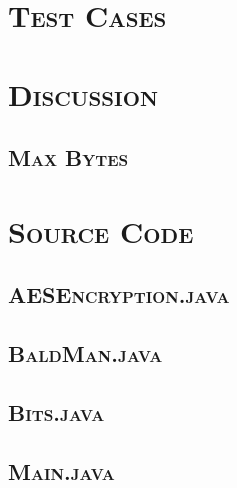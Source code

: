 \documentclass[12pt]{article}
\begin{document}
	\section[Test Cases]{\Large{}\selectfont\scshape Test Cases}
	
	\section[Discussion]{\Large{}\selectfont\scshape Discussion}
	
	\subsection[Max Bytes]{\hspace*{1em}\large{}\selectfont\scshape Max Bytes}
	
	\section[Source Code]{\Large{}\selectfont\scshape Source Code}
	
	\subsection[AESEncryption]{\hspace*{1em}\large{}\selectfont\scshape AESEncryption.java}
	
	
	\subsection[BaldMan]{\hspace*{1em}\large{}\selectfont\scshape BaldMan.java}
	
	
	\subsection[Bits]{\hspace*{1em}\large{}\selectfont\scshape Bits.java}
	
	
	\subsection[Main]{\hspace*{1em}\large{}\selectfont\scshape Main.java}
	
	
\end{document}
